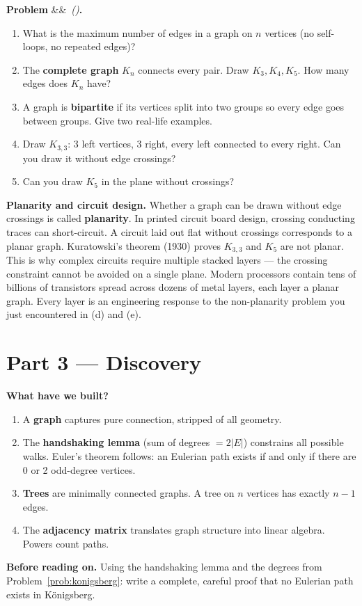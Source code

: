 \documentclass[12pt, a4paper]{article}
\newcounter{problem}
\newenvironment{problem}[1][]{%
  \refstepcounter{problem}%
  \par\vspace{6pt}%
  \noindent\textbf{\color{MidBlue}Problem \theproblem}%
  \ifx&#1&\else\ \textit{(#1)}\fi\textbf{.}\enskip
}{\par\vspace{4pt}}
\begin{document}
\begin{problem}
\label{prob:counting}
\begin{enumerate}[label=(\alph*),topsep=2pt]
  \item What is the maximum number of edges in a graph on $n$ vertices (no self-loops, no repeated edges)?
  \item The \textbf{complete graph} $K_n$ connects every pair. Draw $K_3, K_4, K_5$. How many edges does $K_n$ have?
  \item A graph is \textbf{bipartite} if its vertices split into two groups so every edge goes between groups. Give two real-life examples.
  \item Draw $K_{3,3}$: 3 left vertices, 3 right, every left connected to every right. Can you draw it without edge crossings?
  \item Can you draw $K_5$ in the plane without crossings?
\end{enumerate}
\end{problem}

\begin{thought}
\textbf{Planarity and circuit design.}
Whether a graph can be drawn without edge crossings is called \textbf{planarity}. In printed circuit board design, crossing conducting traces can short-circuit. A circuit laid out flat without crossings corresponds to a planar graph. Kuratowski's theorem (1930) proves $K_{3,3}$ and $K_5$ are not planar. This is why complex circuits require multiple stacked layers --- the crossing constraint cannot be avoided on a single plane. Modern processors contain tens of billions of transistors spread across dozens of metal layers, each layer a planar graph. Every layer is an engineering response to the non-planarity problem you just encountered in (d) and (e).
\end{thought}

\section{Part 3 --- Discovery}

\begin{discoverybox}
\textbf{What have we built?}

\begin{enumerate}
  \item A \textbf{graph} captures pure connection, stripped of all geometry.
  \item The \textbf{handshaking lemma} (sum of degrees $= 2|E|$) constrains all possible walks. Euler's theorem follows: an Eulerian path exists if and only if there are 0 or 2 odd-degree vertices.
  \item \textbf{Trees} are minimally connected graphs. A tree on $n$ vertices has exactly $n-1$ edges.
  \item The \textbf{adjacency matrix} translates graph structure into linear algebra. Powers count paths.
\end{enumerate}

\textbf{Before reading on.} Using the handshaking lemma and the degrees from Problem~\ref{prob:konigsberg}: write a complete, careful proof that no Eulerian path exists in K\"{o}nigsberg.
\end{discoverybox}
\end{document}
